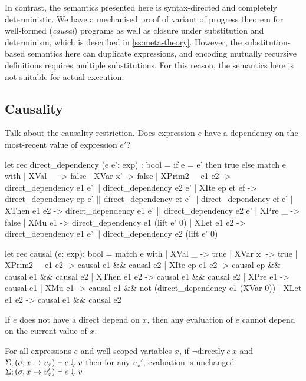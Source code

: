 \documentclass[sigplan,screen]{acmart}
\begin{document}
In contrast, the semantics presented here is syntax-directed and completely deterministic.
We have a mechanised proof of variant of progress theorem for well-formed (\emph{causal}) programs as well as closure under substitution and determinism, which is described in \autoref{ss:meta-theory}.
However, the substitution-based semantics here can duplicate expressions, and encoding mutually recursive definitions requires multiple substitutions.
For this reason, the semantics here is not suitable for actual execution.

\subsection{Causality}
\label{ss:causality}

Talk about the causality restriction.
Does expression $e$ have a dependency on the most-recent value of expression $e'$?

\begin{code}
let rec direct_dependency (e e': exp) : bool =
  if e = e' then true
  else
  match e with
  | XVal _ -> false
  | XVar x' -> false
  | XPrim2 _ e1 e2 -> direct_dependency e1 e' || direct_dependency e2 e'
  | XIte ep et ef -> direct_dependency ep e' || direct_dependency et e' || direct_dependency ef e'
  | XThen e1 e2 -> direct_dependency e1 e' || direct_dependency e2 e'
  | XPre _ -> false
  | XMu e1 -> direct_dependency e1 (lift e' 0)
  | XLet e1 e2 -> direct_dependency e1 e' || direct_dependency e2 (lift e' 0)

let rec causal (e: exp): bool =
  match e with
  | XVal _ -> true
  | XVar x' -> true
  | XPrim2 _ e1 e2 -> causal e1 && causal e2
  | XIte ep e1 e2 -> causal ep && causal e1 && causal e2
  | XThen e1 e2 -> causal e1 && causal e2
  | XPre e1 -> causal e1
  | XMu e1 -> causal e1 && not (direct_dependency e1 (XVar 0))
  | XLet e1 e2 -> causal e1 && causal e2
\end{code}


\begin{lemma}
If $e$ does not have a direct depend on $x$, then any evaluation of $e$ cannot depend on the current value of $x$.
  
For all expressions $e$ and well-scoped variables $x$,
if $\neg \mbox{directly} ~e~ x$ and
$\Sigma; (\sigma, x \mapsto v_x) \vdash e \Downarrow v$
then for any $v_x'$, evaluation is unchanged
$\Sigma; (\sigma, x \mapsto v_x') \vdash e \Downarrow v$
\end{lemma}
\end{document}
